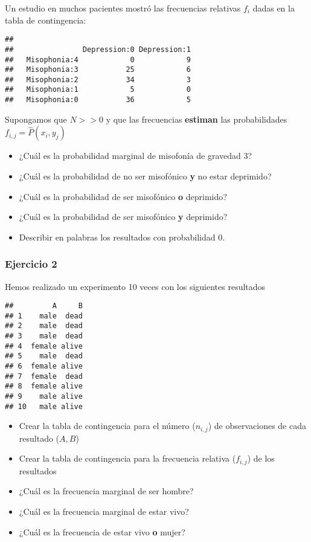\documentclass[
]{book}
\providecommand{\tightlist}{%
  \setlength{\itemsep}{0pt}\setlength{\parskip}{0pt}}
\begin{document}
Un estudio en muchos pacientes mostró las frecuencias relativas \(f_i\) dadas en la tabla de contingencia:

\begin{verbatim}
##               
##                Depression:0 Depression:1
##   Misophonia:4            0            9
##   Misophonia:3           25            6
##   Misophonia:2           34            3
##   Misophonia:1            5            0
##   Misophonia:0           36            5
\end{verbatim}

Supongamos que \(N>>0\) y que las frecuencias \textbf{estiman} las probabilidades \(f_{i,j}=\hat{P}(x_i, y_j)\)

\begin{itemize}
\tightlist
\item
  ¿Cuál es la probabilidad marginal de misofonía de gravedad 3?
\item
  ¿Cuál es la probabilidad de no ser misofónico \textbf{y} no estar deprimido?
\item
  ¿Cuál es la probabilidad de ser misofónico \textbf{o} deprimido?
\item
  ¿Cuál es la probabilidad de ser misofónico \textbf{y} deprimido?
\item
  Describir en palabras los resultados con probabilidad 0.
\end{itemize}

\hypertarget{ejercicio-2-1}{%
\subsubsection{Ejercicio 2}\label{ejercicio-2-1}}

Hemos realizado un experimento 10 veces con los siguientes resultados

\begin{verbatim}
##         A     B
## 1    male  dead
## 2    male  dead
## 3    male  dead
## 4  female alive
## 5    male  dead
## 6  female alive
## 7  female  dead
## 8  female alive
## 9    male alive
## 10   male alive
\end{verbatim}

\begin{itemize}
\tightlist
\item
  Crear la tabla de contingencia para el número (\(n_{i,j}\)) de observaciones de cada resultado (\(A,B\))
\item
  Crear la tabla de contingencia para la frecuencia relativa (\(f_{i,j}\)) de los resultados
\item
  ¿Cuál es la frecuencia marginal de ser hombre?
\item
  ¿Cuál es la frecuencia marginal de estar vivo?
\item
  ¿Cuál es la frecuencia de estar vivo \textbf{o} mujer?
\end{itemize}
\end{document}
